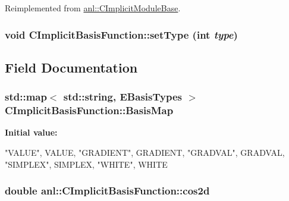 Reimplemented from \hyperlink{classanl_1_1CImplicitModuleBase_a12e7dc121de7ff95dd1952af2679867c}{anl::CImplicitModuleBase}.\hypertarget{classanl_1_1CImplicitBasisFunction_ae265237f2d9340a2add93c0710d6fbfd}{
\subsubsection[{setType}]{\setlength{\rightskip}{0pt plus 5cm}void CImplicitBasisFunction::setType (int {\em type})}}
\label{classanl_1_1CImplicitBasisFunction_ae265237f2d9340a2add93c0710d6fbfd}


\subsection{Field Documentation}
\hypertarget{classanl_1_1CImplicitBasisFunction_a51023c4a91ea9e150fe7e2deb24e2d8d}{
\subsubsection[{BasisMap}]{\setlength{\rightskip}{0pt plus 5cm}std::map$<$ std::string, {\bf EBasisTypes} $>$ {\bf CImplicitBasisFunction::BasisMap}}}
\label{classanl_1_1CImplicitBasisFunction_a51023c4a91ea9e150fe7e2deb24e2d8d}
{\bfseries Initial value:}
\begin{DoxyCode}
 {
    {"VALUE", VALUE},
    {"GRADIENT", GRADIENT},
    {"GRADVAL", GRADVAL},
    {"SIMPLEX", SIMPLEX},
    {"WHITE", WHITE}
}
\end{DoxyCode}
\hypertarget{classanl_1_1CImplicitBasisFunction_af6199d27242cd9df2d619b38647cf437}{
\subsubsection[{cos2d}]{\setlength{\rightskip}{0pt plus 5cm}double {\bf anl::CImplicitBasisFunction::cos2d}}}
\label{classanl_1_1CImplicitBasisFunction_af6199d27242cd9df2d619b38647cf437}
